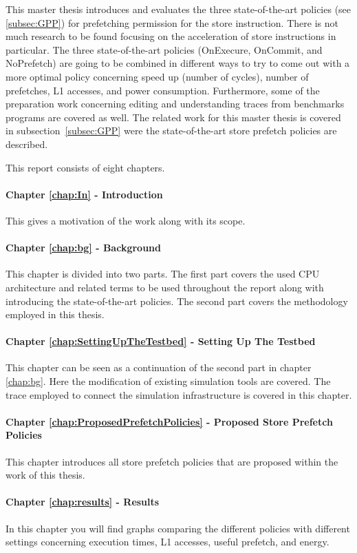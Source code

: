 This master thesis introduces and evaluates the three state-of-the-art policies (see \ref{subsec:GPP}) for prefetching permission for the store instruction. There is not much research to be found focusing on the acceleration of store instructions in particular. The three state-of-the-art policies (OnExecure, OnCommit, and NoPrefetch) are going to be combined in different ways to try to come out with a more optimal policy concerning speed up (number of cycles), number of prefetches, L1 accesses, and power consumption. Furthermore, some of the preparation work concerning editing and understanding traces from benchmarks programs are covered as well. 
The related work for this master thesis is covered in subsection~\ref{subsec:GPP} were the state-of-the-art store prefetch policies are described. 



This report consists of eight chapters. 
\paragraph{Chapter \ref{chap:In} - Introduction} This gives a motivation of the work along with its scope. 
\paragraph{Chapter \ref{chap:bg} - Background} This chapter is divided into two parts. The first part covers
the used CPU architecture and related terms to be used throughout the report along with introducing the state-of-the-art policies. The second part covers the methodology employed in this thesis.
\paragraph{Chapter \ref{chap:SettingUpTheTestbed} - Setting Up The Testbed} This chapter can be seen as a continuation of the
second part in chapter \ref{chap:bg}.  Here the modification of existing simulation tools are covered. The trace employed to connect the simulation infrastructure is covered in this chapter.
\paragraph{Chapter \ref{chap:ProposedPrefetchPolicies} - Proposed Store Prefetch Policies} This chapter introduces all store
 prefetch policies that are proposed within the work of this thesis.
\paragraph{Chapter \ref{chap:results} - Results} In this chapter you will find graphs comparing the different
 policies with different settings concerning execution times, L1 accesses, useful prefetch, and energy.
